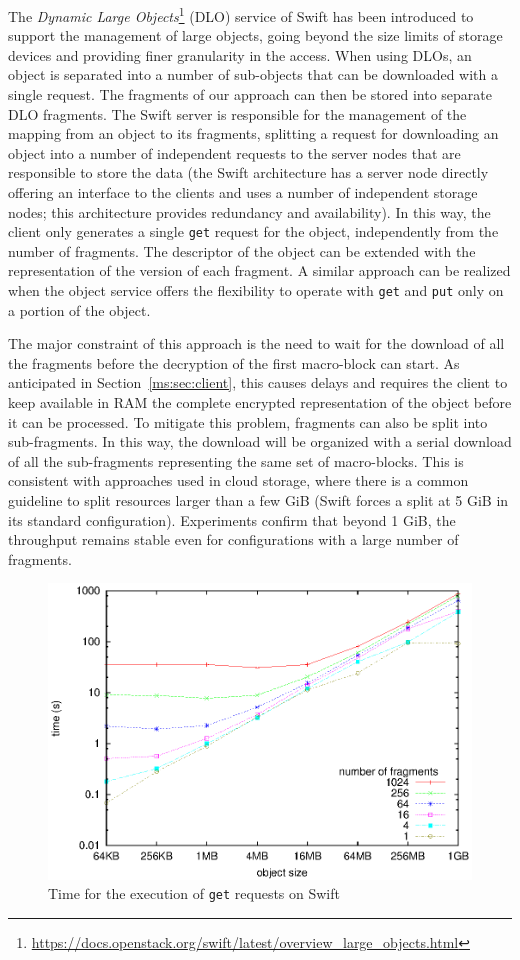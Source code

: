 \medskip
{}  
The {\em Dynamic Large Objects}\footnote{\url{https://docs.openstack.org/swift/latest/overview_large_objects.html}} (DLO) service of Swift has been introduced to support the management of large objects, going beyond the size limits of storage devices and providing finer granularity in the access. When using DLOs, an object is separated into a number of sub-objects that can be downloaded with a single request. The fragments of our approach can then be stored into separate DLO fragments. The Swift server is responsible for the management of the mapping from an object to its fragments, splitting a request for downloading an object into a number of independent requests to the server nodes that are responsible to store the data (the Swift architecture has a server node directly offering an interface to the clients and uses a number of independent storage nodes; this architecture provides redundancy and availability). In this way, the client only generates a single {\tt get} request for the object, independently from the number of fragments. The descriptor of the object can be extended with the representation of the version of each fragment. A similar approach can be realized when the object service offers the flexibility to operate with {\tt get} and {\tt put} only on a portion of the object.

The major constraint of this approach is the need to wait for the download of all the fragments before the decryption of the first macro-block can start. As anticipated in Section~\ref{ms:sec:client}, this causes delays and requires the client to keep available in RAM the complete encrypted representation of the object before it can be processed. To mitigate this problem, fragments can also be split into sub-fragments. In this way, the download will be organized with a serial download of all the sub-fragments representing the same set of macro-blocks. This is consistent with approaches used in cloud storage, where there is a common guideline to split resources larger than a few GiB (Swift forces a split at 5 GiB in its standard configuration). Experiments confirm that beyond 1 GiB, the throughput remains stable even for configurations with a large number of fragments.

\begin{figure}[t]
\centering
\includegraphics[width=0.8\columnwidth,valign=t]{figures/fig10}
\caption{\label{ms:fig:getPlain}Time for the execution of {\tt get} requests on Swift}
\end{figure}

